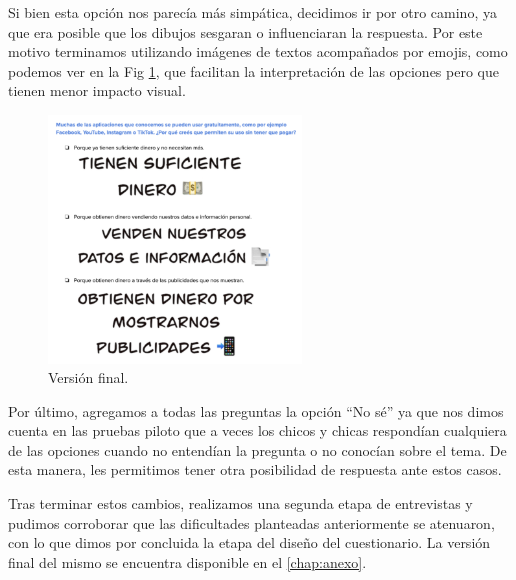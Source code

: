 Si bien esta opción nos parecía más simpática, decidimos ir por otro camino, ya que era posible que los dibujos sesgaran o influenciaran la respuesta. Por este motivo terminamos utilizando imágenes de textos acompañados por emojis, como podemos ver en la Fig \ref{fig:cuest8}, que facilitan la interpretación de las opciones pero que tienen menor impacto visual.

\begin{figure}[h]
    \centering
    \includegraphics[width=0.6\textwidth]{images/8.png} 
    \caption{Versión final.}
    \label{fig:cuest8}
\end{figure}

Por último, agregamos a todas las preguntas la opción “No sé” ya que nos dimos cuenta en las pruebas piloto que a veces los chicos y chicas respondían cualquiera de las opciones cuando no entendían la pregunta o no conocían sobre el tema. De esta manera, les permitimos tener otra posibilidad de respuesta ante estos casos.

Tras terminar estos cambios, realizamos una segunda etapa de entrevistas y pudimos corroborar que las dificultades planteadas anteriormente se atenuaron, con lo que dimos por concluida la etapa del diseño del cuestionario. La versión final del mismo se encuentra disponible en el \autoref{chap:anexo}. 
